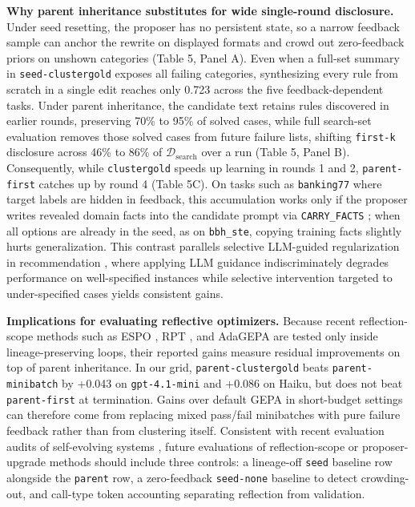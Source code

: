 \documentclass[10pt]{article}
\begin{document}
\textbf{Why parent inheritance substitutes for wide single-round
disclosure.} Under seed resetting, the proposer has no persistent state,
so a narrow feedback sample can anchor the rewrite on displayed formats
and crowd out zero-feedback priors on unshown categories (Table 5, Panel
A). Even when a full-set summary in \texttt{seed-clustergold} exposes
all failing categories, synthesizing every rule from scratch in a single
edit reaches only 0.723 across the five feedback-dependent tasks. Under
parent inheritance, the candidate text retains rules discovered in
earlier rounds, preserving 70\% to 95\% of solved cases, while full
search-set evaluation removes those solved cases from future failure
lists, shifting \texttt{first-k} disclosure across 46\% to 86\% of
\(\mathcal{D}_{\text{search}}\) over a run (Table 5, Panel B).
Consequently, while \texttt{clustergold} speeds up learning in rounds 1
and 2, \texttt{parent-first} catches up by round 4 (Table 5C). On tasks
such as \texttt{banking77} where target labels are hidden in feedback,
this accumulation works only if the proposer writes revealed domain
facts into the candidate prompt via \texttt{CARRY\_FACTS}
\citep{shi2025integrating}; when all options are already in the seed, as
on \texttt{bbh\_ste}, copying training facts slightly hurts
generalization. This contrast parallels selective LLM-guided
regularization in recommendation \citep{shi2026selective}, where
applying LLM guidance indiscriminately degrades performance on
well-specified instances while selective intervention targeted to
under-specified cases yields consistent gains.

\textbf{Implications for evaluating reflective optimizers.} Because
recent reflection-scope methods such as ESPO \citep{liu2026espo}, RPT
\citep{bayat2026reflective}, and AdaGEPA \citep{chen2026adagepa} are
tested only inside lineage-preserving loops, their reported gains
measure residual improvements on top of parent inheritance. In our grid,
\texttt{parent-clustergold} beats \texttt{parent-minibatch} by +0.043 on
\texttt{gpt-4.1-mini} and +0.086 on Haiku, but does not beat
\texttt{parent-first} at termination. Gains over default GEPA in
short-budget settings can therefore come from replacing mixed pass/fail
minibatches with pure failure feedback rather than from clustering
itself. Consistent with recent evaluation audits of self-evolving
systems \citep{yang2026selfevolvingrecsys}, future evaluations of
reflection-scope or proposer-upgrade methods should include three
controls: a lineage-off \texttt{seed} baseline row alongside the
\texttt{parent} row, a zero-feedback \texttt{seed-none} baseline to
detect crowding-out, and call-type token accounting separating
reflection from validation.
\end{document}
